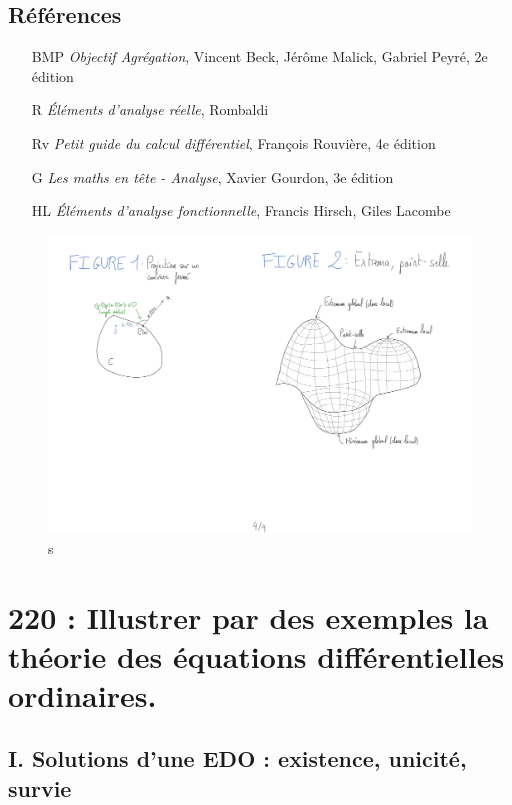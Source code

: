 \documentclass[10pt, a4paper, parskip=full, twoside, twocolumn]{report}
\begin{document}
\section*{Références}
\begin{itemize}
	\item[BMP] \emph{Objectif Agrégation}, Vincent Beck, Jérôme Malick, Gabriel Peyré, 2e édition
	\item[R] \emph{Éléments d'analyse réelle}, Rombaldi
	\item[Rv] \emph{Petit guide du calcul différentiel}, François Rouvière, 4e édition
	\item[G] \emph{Les maths en tête - Analyse}, Xavier Gourdon, 3e édition 
	\item[HL] \emph{Éléments d'analyse fonctionnelle}, Francis Hirsch, Giles Lacombe
\end{itemize}

\begin{figure}[!htb]
	\centering
	\includegraphics[trim={0 0 0 0},clip,width=1\linewidth]{img/219.pdf}
	\caption{s}
\end{figure}


\chapter*{220 : Illustrer par des exemples la théorie des équations différentielles ordinaires.}
\setcounter{definition}{0}

\section*{I. Solutions d'une EDO : existence, unicité, survie}
\end{document}
